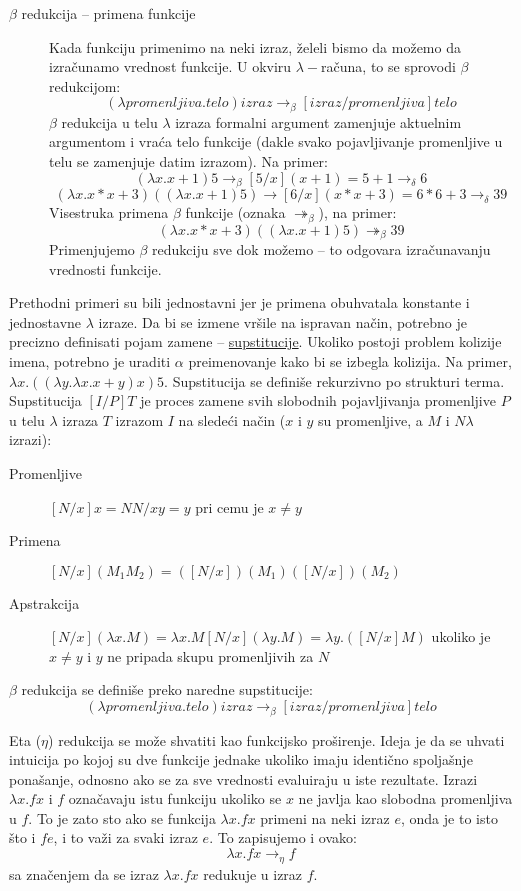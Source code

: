 \documentclass[../main.tex]{subfiles}
\begin{document}
\begin{description}
\item[$\beta$ redukcija -- primena funkcije] \hfill

Kada funkciju primenimo na neki izraz, želeli bismo da možemo da izračunamo vrednost funkcije. U okviru $\lambda-$računa, to se sprovodi $\beta$ redukcijom: 
$$ (\lambda promenljiva.telo)izraz \rightarrow_{\beta} [izraz/promenljiva]telo $$
$\beta$ redukcija u telu $\lambda$ izraza formalni argument zamenjuje aktuelnim argumentom i vraća telo funkcije (dakle svako pojavljivanje promenljive u telu se zamenjuje datim izrazom). Na primer:
$$(\lambda x.x + 1)5 \rightarrow_{\beta} [5/x](x+1) = 5 + 1 \rightarrow_{\delta} 6$$
$$(\lambda x.x * x + 3)((\lambda x.x + 1)5) \rightarrow [6/x](x * x + 3) = 6 * 6 + 3 \rightarrow_{\delta} 39$$
Visestruka primena $\beta$ funkcije (oznaka $\twoheadrightarrow_\beta$), na primer:
$$(\lambda x.x * x +3)((\lambda x.x + 1)5) \twoheadrightarrow_\beta 39$$
Primenjujemo $\beta$ redukciju sve dok možemo -- to odgovara izračunavanju vrednosti funkcije.

\end{description}

Prethodni primeri su bili jednostavni jer je primena obuhvatala konstante i jednostavne $\lambda$ izraze. Da bi se izmene vršile na ispravan način, potrebno je precizno definisati pojam zamene -- \underline{supstitucije}. Ukoliko postoji problem kolizije imena, potrebno je uraditi $\alpha$ preimenovanje kako bi se izbegla kolizija. Na primer, $\lambda x.((\lambda y.\lambda x.x + y)x)5$. Supstitucija se definiše rekurzivno po strukturi terma.\\
Supstitucija $[I/P]T$ je proces zamene svih slobodnih pojavljivanja promenljive $P$ u telu $\lambda$ izraza $T$ izrazom $I$ na sledeći način ($x$ i $y$ su promenljive, a $M$ i $N \lambda$ izrazi):
\begin{description}
\item[Promenljive] $[N/x]x = N {N/x}y = y$ pri cemu je $x\ne y$
\item[Primena] $[N/x](M_1 M_2) = ([N/x])(M_1)([N/x])(M_2)$ 
\item[Apstrakcija] $[N/x](\lambda x.M) = \lambda x.M [N/x](\lambda y.M) = \lambda y.([N/x]M)$ ukoliko je $x\ne y$ i $y$ ne pripada skupu promenljivih za $N$
\end{description}

$\beta$ redukcija se definiše preko naredne supstitucije:
$$ (\lambda promenljiva.telo)izraz \rightarrow_{\beta} [izraz/promenljiva]telo $$

Eta ($\eta$) redukcija se može shvatiti kao funkcijsko proširenje. Ideja je da se uhvati intuicija po kojoj su dve funkcije jednake ukoliko imaju identično spoljašnje ponašanje, odnosno ako se za sve vrednosti evaluiraju u iste rezultate. Izrazi $\lambda x. f x$ i $f$ označavaju istu funkciju ukoliko se $x$ ne javlja kao slobodna promenljiva u $f$. To je zato sto ako se funkcija $\lambda x. f x$ primeni na neki izraz $e$, onda je to isto što i $f e$, i to važi za svaki izraz $e$. To zapisujemo i ovako:
$$ \lambda x. f x \rightarrow_\eta f$$
sa značenjem da se izraz $\lambda x. f x$ redukuje u izraz $f$.
\end{document}
